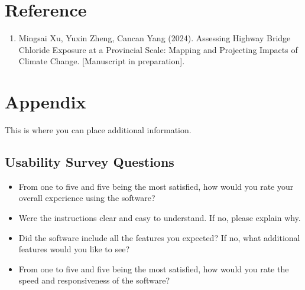 \documentclass[12pt, titlepage]{article}
\newcounter{refnum} %
\begin{document}
%

\section*{Reference}
\begin{enumerate}
\item {} \label{ref1}
Mingsai Xu, Yuxin Zheng, Cancan Yang (2024). Assessing Highway Bridge Chloride Exposure at a Provincial Scale: Mapping and Projecting Impacts of Climate Change.  [Manuscript in preparation].

\end{enumerate}


\newpage

\section{Appendix}

This is where you can place additional information.

\subsection{Usability Survey Questions}\label{USQ}
\begin{itemize}
\item From one to five and five being the most satisfied, how would you rate your overall experience using the software?
\item Were the instructions clear and easy to understand. If no, please explain why.
\item Did the software include all the features you expected? If no, what additional features would you like to see?
\item From one to five and five being the most satisfied, how would you rate the speed and responsiveness of the software?
\end{itemize}
\end{document}
